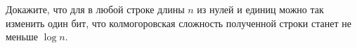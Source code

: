 Докажите, что для в любой строке длины $n$ из нулей и единиц можно так изменить один бит, что
колмогоровская сложность полученной строки станет не меньше $\log n$.
